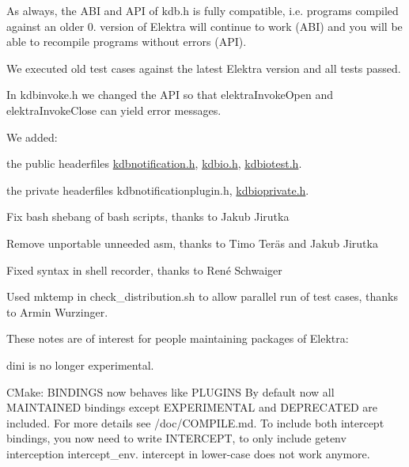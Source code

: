 As always, the A\+BI and A\+PI of kdb.\+h is fully compatible, i.\+e. programs compiled against an older 0. version of Elektra will continue to work (A\+BI) and you will be able to recompile programs without errors (A\+PI).

We executed old test cases against the latest Elektra version and all tests passed.

In {\ttfamily kdbinvoke.\+h} we changed the A\+PI so that {\ttfamily elektra\+Invoke\+Open} and {\ttfamily elektra\+Invoke\+Close} can yield error messages.

We added\+:


\begin{DoxyItemize}
\item the public headerfiles {\ttfamily \mbox{\hyperlink{kdbnotification_8h}{kdbnotification.\+h}}}, {\ttfamily \mbox{\hyperlink{kdbio_8h}{kdbio.\+h}}}, {\ttfamily \mbox{\hyperlink{kdbiotest_8h}{kdbiotest.\+h}}}.
\item the private headerfiles {\ttfamily kdbnotificationplugin.\+h}, {\ttfamily \mbox{\hyperlink{kdbioprivate_8h}{kdbioprivate.\+h}}}.
\end{DoxyItemize}


\begin{DoxyItemize}
\item Fix bash shebang of bash scripts, thanks to Jakub Jirutka
\item Remove unportable unneeded asm, thanks to Timo Teräs and Jakub Jirutka
\item Fixed syntax in shell recorder, thanks to René Schwaiger
\item Used {\ttfamily mktemp} in {\ttfamily check\+\_\+distribution.\+sh} to allow parallel run of test cases, thanks to Armin Wurzinger.
\end{DoxyItemize}

These notes are of interest for people maintaining packages of Elektra\+:


\begin{DoxyItemize}
\item {\ttfamily dini} is no longer experimental.
\item C\+Make\+: {\ttfamily B\+I\+N\+D\+I\+N\+GS} now behaves like {\ttfamily P\+L\+U\+G\+I\+NS} By default now all M\+A\+I\+N\+T\+A\+I\+N\+ED bindings except E\+X\+P\+E\+R\+I\+M\+E\+N\+T\+AL and D\+E\+P\+R\+E\+C\+A\+T\+ED are included. For more details see /doc/\+C\+O\+M\+P\+I\+LE.md. To include both intercept bindings, you now need to write {\ttfamily I\+N\+T\+E\+R\+C\+E\+PT}, to only include getenv interception {\ttfamily intercept\+\_\+env}. {\ttfamily intercept} in lower-\/case does not work anymore.
\end{DoxyItemize}

